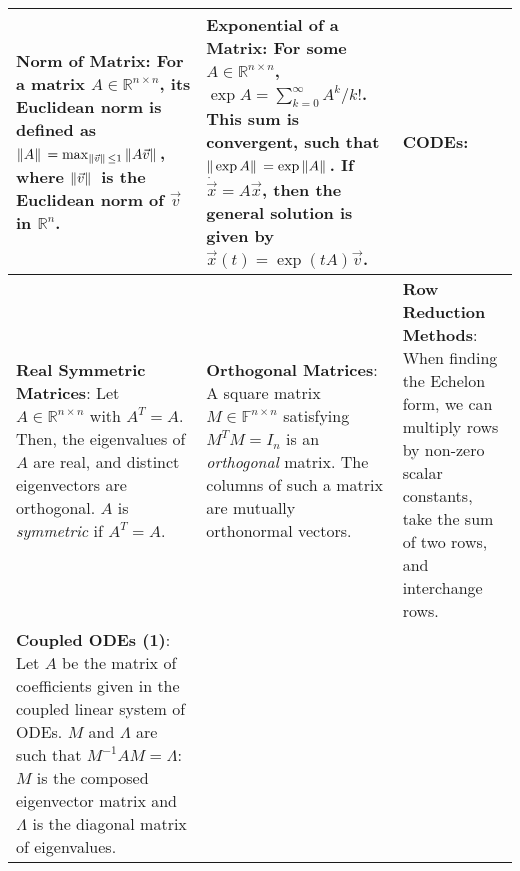 \clearpage
%
%
\begin{tabular}{|m{.31\linewidth}|m{.31\linewidth}|m{.31\linewidth}|}
\hline

\textbf{Norm of Matrix}:
    For a matrix $ A \in \mathbb{R}^{n \times n} $, its Euclidean norm is
    defined as $ \|A\|\, = \max_{\|\vec{v}\|\, \leq 1} \|A \vec{v}\|\, $,
    where $ \|\vec{v}\|\, $ is the Euclidean norm of $ \vec{v} $ in $
    \mathbb{R}^n $. &

\textbf{Exponential of a Matrix}:
    For some $ A \in \mathbb{R}^{n \times n} $, $ \exp A = \sum_{k=0}^\infty
    A^k/k! $. This sum is convergent, such that $ \|\exp A\|\, = \exp \|A\|\,
    $. If $ \dot{\vec{x}} = A\vec{x} $, then the general solution is given by $
    \vec{x}(t) = \exp(tA)\vec{v} $. &

\textbf{CODEs}:
    \smash{$
        \ldots\vec{x}(t) = \mathconst{e}^{tA}\vec{v} = M
        \begin{pmatrix}
            \mathconst{e}^{\lambda_1 t} & 0 & \ldots \\
            0 & \mathconst{e}^{\lambda_2 t} & \ldots \\
            \ldots & \ldots & \mathconst{e}^{\lambda_n t}
        \end{pmatrix}
        M^{-1}\vec{v}
    $} \\

\hline

\textbf{Real Symmetric Matrices}:
    Let $ A \in \mathbb{R}^{n \times n} $ with $ A^T = A $. Then, the
    eigenvalues of $ A $ are real, and distinct eigenvectors are orthogonal. $ A
    $ is \emph{symmetric} if $ A^T = A $. &

\textbf{Orthogonal Matrices}:
    A square matrix $ M \in \mathbb{F}^{n \times n} $ satisfying $ M^T M = I_n $
    is an \emph{orthogonal} matrix. The columns of such a matrix are mutually
    orthonormal vectors. &

\textbf{Row Reduction Methods}:
    When finding the Echelon form, we can multiply rows by non-zero scalar
    constants, take the sum of two rows, and interchange rows. \\

\hline

\textbf{Coupled ODEs (1)}:
    Let $ A $ be the matrix of coefficients given in the coupled linear system
    of ODEs. $ M $ and $ \Lambda $ are such that $ M^{-1}AM = \Lambda $: $ M $
    is the composed eigenvector matrix and $ \Lambda $ is the diagonal matrix of
    eigenvalues. &


\end{tabular}
